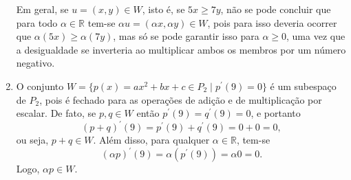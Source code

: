 \documentclass[12pt,a4paper]{article}
\newcommand*\R{\mathbb{R}}
\begin{document}
\begin{ExerciseList}
\begin{enumerate}
Em geral, se $u = (x,y) \in W$, isto é, se $5x \geq 7y$, não se pode concluir que
para todo $\alpha \in \R$ tem-se $\alpha u = (\alpha x, \alpha y) \in W$, pois para isso deveria ocorrer que $\alpha (5x) \geq \alpha (7y)$, mas só se pode garantir isso para $\alpha \geq 0$, uma vez que a desigualdade se inverteria ao multiplicar ambos os membros por um número negativo.

\item O conjunto $W = \{ p(x) = ax^2+bx+c \in P_2 \mid p^\prime(9) = 0 \}$ é um subespaço de $P_2$, pois é fechado para as operações de adição e de multiplicação por escalar. De fato, se $p,q \in W$ então $p^\prime(9) = q^\prime(9) = 0$, e portanto
\[
(p+q)^\prime(9) = p^\prime(9) + q^\prime(9) = 0 + 0 = 0,
\]
ou seja, $p+q \in W$. Além disso, para qualquer $\alpha \in \R$, tem-se
\[
(\alpha p)^\prime(9) = \alpha (p^\prime(9)) = \alpha 0 = 0.
\]
Logo, $\alpha p \in W$.
\end{enumerate}


\end{ExerciseList}
\end{document}
